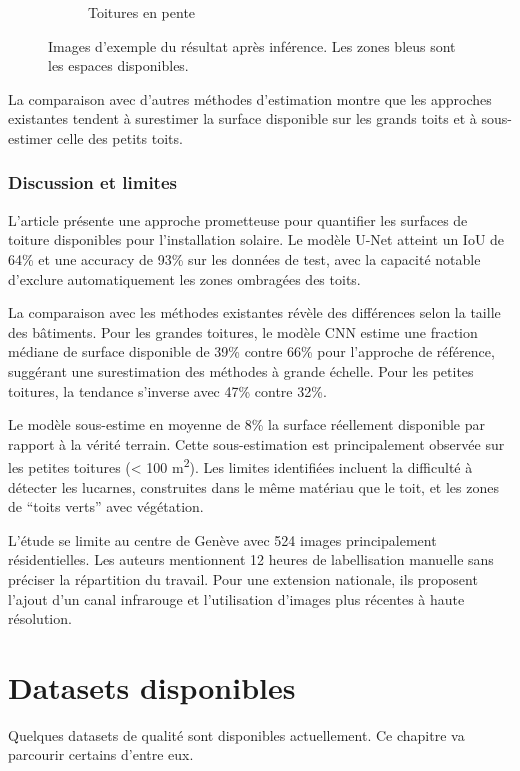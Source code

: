 \begin{figure}[H]
\begin{subfigure}{0.43\textwidth}
        \caption{Toitures en pente}
        \label{fig:castello_quantification_image_resultat2}
    \end{subfigure}
    \caption{Images d'exemple \cite{castello_quantification_2021} du résultat après inférence. Les zones bleus sont les espaces disponibles.}
    \label{fig:castello_quantification_image_resultat}
\end{figure}

La comparaison avec d'autres méthodes d'estimation \cite{walch_big_2020} montre que les approches existantes tendent à surestimer la surface disponible sur les grands toits et à sous-estimer celle des petits toits.

\subsubsection{Discussion et limites}
\par{L'article présente une approche prometteuse pour quantifier les surfaces de toiture disponibles pour l'installation solaire. Le modèle U-Net atteint un IoU de 64\% et une accuracy de 93\% sur les données de test, avec la capacité notable d'exclure automatiquement les zones ombragées des toits.}
\par{La comparaison avec les méthodes existantes \cite{walch_big_2020} révèle des différences selon la taille des bâtiments. Pour les grandes toitures, le modèle CNN estime une fraction médiane de surface disponible de 39\% contre 66\% pour l'approche de référence, suggérant une surestimation des méthodes à grande échelle. Pour les petites toitures, la tendance s'inverse avec 47\% contre 32\%.}
\par{Le modèle sous-estime en moyenne de 8\% la surface réellement disponible par rapport à la vérité terrain. Cette sous-estimation est principalement observée sur les petites toitures (< 100 \si{\unit{m^2}}). Les limites identifiées incluent la difficulté à détecter les lucarnes, construites dans le même matériau que le toit, et les zones de ``toits verts'' avec végétation.}
\par{L'étude se limite au centre de Genève avec 524 images principalement résidentielles. Les auteurs mentionnent 12 heures de labellisation manuelle sans préciser la répartition du travail. Pour une extension nationale, ils proposent l'ajout d'un canal infrarouge et l'utilisation d'images plus récentes à haute résolution.}

\section{Datasets disponibles}
\label{sec:dataset_disponible}
\par{Quelques datasets de qualité sont disponibles actuellement. Ce chapitre va parcourir certains d'entre eux.}


